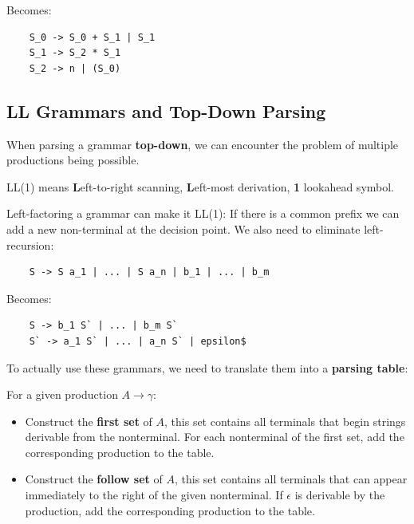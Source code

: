 Becomes:\smallskip

\begin{lstlisting}
	S_0 -> S_0 + S_1 | S_1
	S_1 -> S_2 * S_1
	S_2 -> n | (S_0)
\end{lstlisting}


\subsection*{LL Grammars and Top-Down Parsing}

When parsing a grammar \textbf{top-down}, we can encounter the problem of multiple productions being possible. \medskip
		
LL(1) means \textbf{L}eft-to-right scanning, \textbf{L}eft-most derivation, \textbf{1} lookahead symbol. \medskip
		
Left-factoring a grammar can make it LL(1): If there is a common prefix we can add a new non-terminal at the decision point. We also need to eliminate left-recursion:\smallskip

\begin{lstlisting}
 	S -> S a_1 | ... | S a_n | b_1 | ... | b_m
\end{lstlisting}\smallskip

Becomes:\smallskip

\begin{lstlisting}		
	S -> b_1 S` | ... | b_m S`		
	S` -> a_1 S` | ... | a_n S` | epsilon$
\end{lstlisting}\medskip

To actually use these grammars, we need to translate them into a \textbf{parsing table}: \medskip

For a given production $A \to \gamma$:
\begin{itemize}
	\item Construct the \textbf{first set} of $A$, this set contains all terminals that begin strings derivable from the nonterminal. For each nonterminal of the first set, add the corresponding production to the table.
	
	\item Construct the \textbf{follow set} of $A$, this set contains all terminals that can appear immediately to the right of the given nonterminal. If $\epsilon$ is derivable by the production, add the corresponding production to the table.
\end{itemize}

